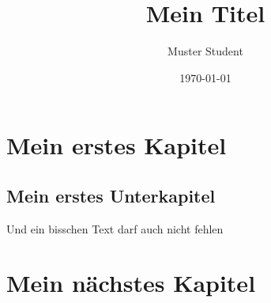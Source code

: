 \documentclass[12pt, titlepage]{scrbook}
\begin{document}
\subject{Master/Bachelorarbeit}
\title{Mein Titel}
\author{Muster Student}
\date{\today}
\publishers{\texttt{[image: UniLogo]}\vspace{\baselineskip}\\
Albert-Ludwigs-Universität Freiburg im Breisgau\\
Meine Fakultät\\
Institut für \LaTeX\vspace{-3cm}
}


\maketitle

\newpage

\tableofcontents

\newpage

\section{Mein erstes Kapitel}

\subsection{Mein erstes Unterkapitel}

Und ein bisschen Text darf auch nicht fehlen \cite{macklin2013position}

\section{Mein nächstes Kapitel}


\newpage


\end{document}
